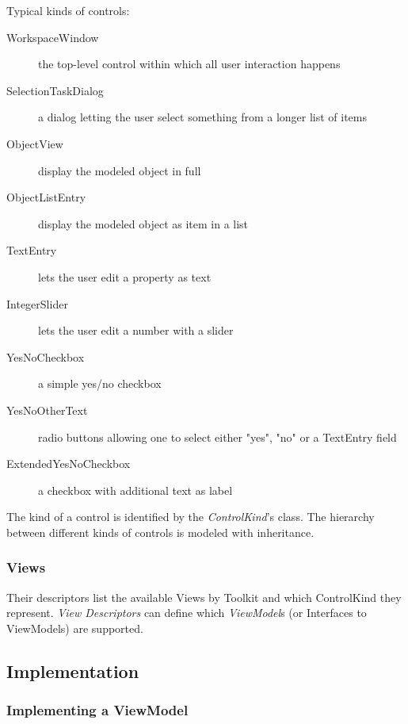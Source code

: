 Typical kinds of controls:

\begin{description}

\item[WorkspaceWindow] {the top-level control within which all user
interaction happens}

\item[SelectionTaskDialog] {a dialog letting the user select something
from a longer list of items}

\item[ObjectView] {display the modeled object in full}

\item[ObjectListEntry] {display the modeled object as item in a list}

\item[TextEntry] {lets the user edit a property as text}

\item[IntegerSlider] {lets the user edit a number with a slider}

\item[YesNoCheckbox] {a simple yes/no checkbox}

\item[YesNoOtherText] {radio buttons allowing one to select either "yes",
"no" or a TextEntry field}

\item[ExtendedYesNoCheckbox] {a checkbox with additional text as label}

\end{description}

The kind of a control is identified by the \emph{ControlKind}'s class. The
hierarchy between different kinds of controls is modeled with inheritance.

\subsubsection{Views}

Their descriptors list the available Views by Toolkit and which ControlKind they represent. \emph{View Descriptors} can define which \emph{ViewModel}s (or Interfaces to ViewModels) are supported.

\subsection{Implementation}

\subsubsection{Implementing a ViewModel}

